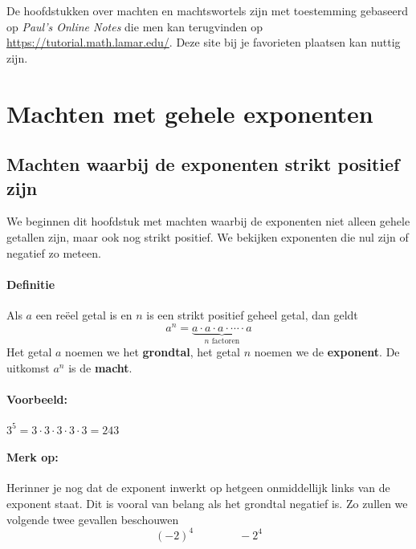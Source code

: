 \documentclass[12pt,twoside]{article}
\begin{document}
De hoofdstukken over machten en machtswortels zijn met toestemming gebaseerd op {\em Paul's Online Notes} die men kan terugvinden op \url{https://tutorial.math.lamar.edu/}. Deze site bij je favorieten plaatsen kan nuttig zijn.

\thispagestyle{empty}
\newpage


\pagestyle{fancy}
\fancyhead[RE,LO]{}

\section{Machten met gehele exponenten}

\subsection{Machten waarbij de exponenten strikt positief zijn}

We beginnen dit hoofdstuk met machten waarbij de exponenten niet alleen gehele getallen zijn, maar ook nog strikt positief. We bekijken exponenten die nul zijn of negatief zo meteen.

\paragraph*{Definitie}
\begin{mdframed}
  Als $a$ een reëel getal is en $n$ is een strikt positief geheel getal, dan geldt
  $$a^n = \underbrace{a \cdot a \cdot a \cdot \cdots \cdot a}_{n \text{ factoren}}$$
  Het getal $a$ noemen we het {\bf grondtal}, het getal $n$ noemen we de {\bf exponent}. De uitkomst $a^n$ is de {\bf macht}.
\end{mdframed}

\paragraph*{Voorbeeld:} $3^5 = 3 \cdot 3 \cdot 3 \cdot 3 \cdot 3 = 243$

\paragraph*{Merk op:} Herinner je nog dat de exponent inwerkt op hetgeen onmiddellijk links van de exponent staat. Dit is vooral van belang als het grondtal negatief is. Zo zullen we volgende twee gevallen beschouwen
$$(-2)^4 \qquad\qquad -2^4$$
\end{document}
